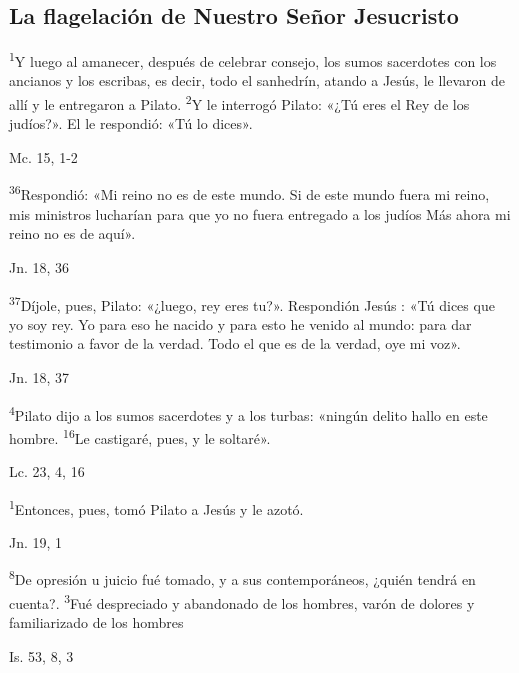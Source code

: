 \documentclass[a4paper,11pt]{article}
\begin{document}
    \subsection*{\hfil La flagelación de Nuestro Señor Jesucristo \hfil}
      
      \textsuperscript{1}Y luego al amanecer, después de celebrar consejo, los sumos sacerdotes con los ancianos y los escribas, es decir, todo el sanhedrín, atando a Jesús,
      le llevaron de allí y le entregaron a Pilato. \textsuperscript{2}Y le interrogó Pilato: «¿Tú eres el Rey de los judíos?». El le respondió: «Tú lo dices».
      \begin{flushright}
        Mc. 15, 1-2
      \end{flushright}

      \textsuperscript{36}Respondió: «Mi reino no es de este mundo. Si de este mundo fuera mi reino, mis ministros lucharían para que yo no fuera entregado a los judíos
      Más ahora mi reino no es de aquí».
      \begin{flushright}
        Jn. 18, 36
      \end{flushright}

      \textsuperscript{37}Díjole, pues, Pilato: «¿luego, rey eres tu?». Respondión Jesús : «Tú dices que yo soy rey. Yo para eso he nacido y para esto he venido
      al mundo: para dar testimonio a favor de la verdad. Todo el que es de la verdad, oye mi voz».
      \begin{flushright}
        Jn. 18, 37
      \end{flushright}

      \textsuperscript{4}Pilato dijo a los sumos sacerdotes y a los turbas: «ningún delito hallo en este hombre. \textsuperscript{16}Le castigaré, pues, y le soltaré».
      \begin{flushright}
        Lc. 23, 4, 16
      \end{flushright}

      \textsuperscript{1}Entonces, pues, tomó Pilato a Jesús y le azotó.
      \begin{flushright}
        Jn. 19, 1
      \end{flushright}

      \textsuperscript{8}De opresión u juicio fué tomado, y a sus contemporáneos, ¿quién tendrá en cuenta?. \textsuperscript{3}Fué despreciado y abandonado de los hombres,
      varón de dolores y familiarizado de los hombres
      \begin{flushright}
        Is. 53, 8, 3
      \end{flushright}
\end{document}
